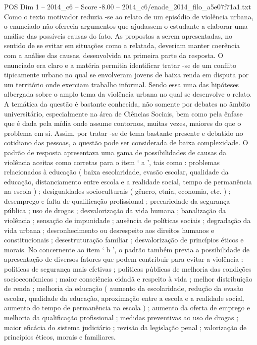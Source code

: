 \begin{textsample}{POS Dim 1 – 2014\_c6 – Score -8.00 – 2014\_c6/enade\_2014\_filo\_a5e07f71a1.txt}
Como o texto motivador reduzia -se ao relato de um episódio de violência urbana, o enunciado não oferecia argumentos que ajudassem o estudante a elaborar uma análise das possíveis causas do fato.
As propostas a serem apresentadas, no sentido de se evitar em situações como a relatada, deveriam manter coerência com a análise das causas, desenvolvida na primeira parte da resposta.
O enunciado era claro e a matéria permitia identificar tratar -se de um conflito tipicamente urbano no qual se envolveram jovens de baixa renda em disputa por um território onde exerciam trabalho informal.
Sendo essa uma das hipóteses albergada sobre o amplo tema da violência urbana no qual se desenvolve o relato.
A temática da questão é bastante conhecida, não somente por debates no âmbito universitário, especialmente na área de Ciências Sociais, bem como pela ênfase que é dada pela mídia onde assume contornos, muitas vezes, maiores do que o problema em si.
Assim, por tratar -se de tema bastante presente e debatido no cotidiano das pessoas, a questão pode ser considerada de baixa complexidade.
O padrão de resposta apresentava uma gama de possibilidades de causas da violência aceitas como corretas para o item ‘ a ’, tais como : problemas relacionados à educação ( baixa escolaridade, evasão escolar, qualidade da educação, distanciamento entre escola e a realidade social, tempo de permanência na escola ) ; desigualdades socioculturais ( gênero, etnia, economia, etc. ) ; desemprego e falta de qualificação profissional ; precariedade da segurança pública ; uso de drogas ; desvalorização da vida humana ; banalização da violência ; sensação de impunidade ; ausência de políticas sociais ; degradação da vida urbana ; desconhecimento ou desrespeito aos direitos humanos e constitucionais ; desestruturação familiar ; desvalorização de princípios éticos e morais.
No concernente ao item ‘ b ’, o padrão também previa a possibilidade de apresentação de diversos fatores que podem contribuir para evitar a violência : políticas de segurança mais efetivas ; políticas públicas de melhoria das condições socioeconômicas ; maior consciência cidadã e respeito à vida ; melhor distribuição de renda ; melhoria da educação ( aumento da escolaridade, redução da evasão escolar, qualidade da educação, aproximação entre a escola e a realidade social, aumento do tempo de permanência na escola ) ; aumento da oferta de emprego e melhoria da qualificação profissional ; medidas preventivas ao uso de drogas ; maior eficácia do sistema judiciário ; revisão da legislação penal ; valorização de princípios éticos, morais e familiares.

\end{textsample}

